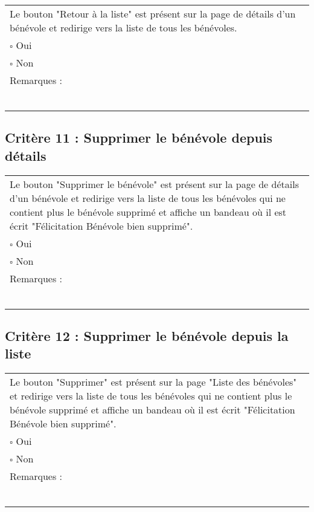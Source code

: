 	\begin{center}
    	 		\begin{tabular}[h]{|p{}|}
			\hline
				Le bouton "Retour à la liste" est présent sur la page de détails d'un bénévole et redirige vers la liste de tous les bénévoles.\\
				$\square$ Oui  \\ $\square$ Non \\\hline Remarques : \\ ~\\
			 \\\hline
     		\end{tabular}
  		\end{center}	
  		
  		
  		\subsection*{Critère 11 : Supprimer le bénévole depuis détails}
	
	\begin{center}
    	 		\begin{tabular}[h]{|p{}|}
			\hline
				Le bouton "Supprimer le bénévole" est présent sur la page de détails d'un bénévole et redirige vers la liste de tous les bénévoles qui ne contient plus le bénévole supprimé et affiche un bandeau où il est écrit "Félicitation Bénévole bien supprimé".\\
				$\square$ Oui  \\ $\square$ Non \\\hline Remarques : \\ ~\\
			 \\\hline
     		\end{tabular}
  		\end{center}
  		
  		
  		
  			\subsection*{Critère 12 : Supprimer le bénévole depuis la liste}
	
	\begin{center}
    	 		\begin{tabular}[h]{|p{}|}
			\hline
				Le bouton "Supprimer" est présent sur la page "Liste des bénévoles" et redirige vers la liste de tous les bénévoles qui ne contient plus le bénévole supprimé et affiche un bandeau où il est écrit "Félicitation Bénévole bien supprimé".\\
				$\square$ Oui  \\ $\square$ Non \\\hline Remarques : \\ ~\\
			 \\\hline
     		\end{tabular}
  		\end{center}


